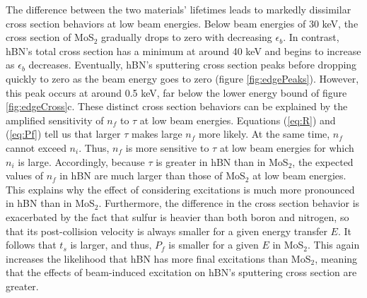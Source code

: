 \documentclass{article}
\begin{document}
The difference between the two materials' lifetimes leads to markedly
dissimilar cross section behaviors at low beam energies.
Below beam energies of 30 keV, the cross section of MoS$_2$ gradually drops to
zero with decreasing $\epsilon_b$.
In contrast, hBN's total cross section has a minimum at around 40 keV and
begins to increase as $\epsilon_b$ decreases.
Eventually, hBN's sputtering cross section peaks before dropping quickly to
zero as the beam energy goes to zero (figure \ref{fig:edgePeaks}).
However, this peak occurs at around 0.5 keV, far below the lower energy bound
of figure \ref{fig:edgeCross}c.
These distinct cross section behaviors can be explained by the amplified
sensitivity of $n_f$ to $\tau$ at low beam energies.
Equations (\ref{eq:R}) and (\ref{eq:Pf}) tell us that larger $\tau$
makes large $n_f$ more likely.
At the same time, $n_f$ cannot exceed $n_i$.
Thus, $n_f$ is more sensitive to $\tau$ at low beam energies for which $n_i$ is
large.
Accordingly, because $\tau$ is greater in hBN than in MoS$_2$, the expected
values of $n_f$ in hBN are much larger than those of MoS$_2$ at low beam
energies.
This explains why the effect of considering excitations is much more
pronounced in hBN than in MoS$_2$.
Furthermore, the difference in the cross section behavior is exacerbated by the
fact that sulfur is heavier than both boron and nitrogen, so that its
post-collision velocity is always smaller for a given energy transfer $E$.
It follows that $t_s$ is larger, and thus, $P_f$ is smaller for a given $E$ in
MoS$_2$.
This again increases the likelihood that hBN has more final excitations than
MoS$_2$, meaning that the effects of beam-induced excitation on hBN's
sputtering cross section are greater.
\end{document}
